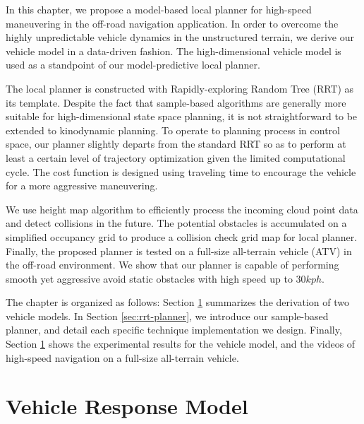 \documentclass[../thesis.tex]{subfiles}
\begin{document}
In this chapter, we propose a model-based local planner for high-speed maneuvering in the off-road navigation application. In order to overcome the highly unpredictable vehicle dynamics in the unstructured terrain, we derive our vehicle model in a data-driven fashion. The high-dimensional vehicle model is used as a standpoint of our model-predictive local planner.

The local planner is constructed with Rapidly-exploring Random Tree (RRT) \cite{kuffner2000rrt} as its template. 
Despite the fact that sample-based algorithms are generally more suitable for high-dimensional state space planning, it is not straightforward to be extended to kinodynamic planning. 
To operate to planning process in control space, our planner slightly departs from the standard RRT so as to perform at least a certain level of trajectory optimization given the limited computational cycle. 
The cost function is designed using traveling time to encourage the vehicle for a more aggressive maneuvering. 

We use height map algorithm to efficiently process the incoming cloud point data and detect collisions in the future. 
The potential obstacles is accumulated on a simplified occupancy grid to produce a collision check grid map for local planner. 
Finally, the proposed planner is tested on a full-size all-terrain vehicle (ATV) in the off-road environment. We show that 
our planner is capable of performing smooth yet aggressive avoid static obstacles with high speed up to $30 kph$.

The chapter is organized as follows:
Section \ref{sec:vehicle_model} summarizes the derivation of two vehicle models. In Section \ref{sec:rrt-planner}, we introduce our sample-based planner, and detail each specific technique implementation we design. Finally, Section \ref{sec:vehicle_model} shows the experimental results for the vehicle model, and the videos of high-speed navigation on a full-size all-terrain vehicle.

\section{Vehicle Response Model} \label{sec:vehicle_model}
\end{document}
